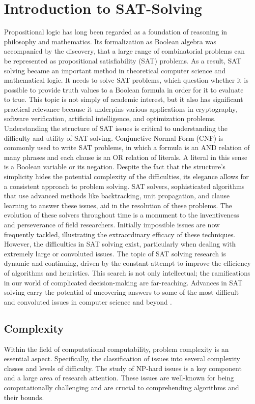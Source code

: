 \documentclass[bachelor, english]{algothesis}
\begin{document}
\section{Introduction to SAT-Solving}
Propositional logic has long been regarded as a foundation of reasoning in philosophy and mathematics. Its formalization as Boolean algebra was accompanied by the discovery, that a large range of combinatorial problems can be represented as propositional satisfiability (SAT) problems. As a result, SAT solving became an important method in theoretical computer science and mathematical logic. It needs to solve SAT problems, which question whether it is possible to provide truth values to a Boolean formula in order for it to evaluate to true. This topic is not simply of academic interest, but it also has significant practical relevance because it underpins various applications in cryptography, software verification, artificial intelligence, and optimization problems. Understanding the structure of SAT issues is critical to understanding the difficulty and utility of SAT solving. Conjunctive Normal Form (CNF) is commonly used to write SAT problems, in which a formula is an AND relation of many phrases and each clause is an OR relation of literals. A literal in this sense is a Boolean variable or its negation. Despite the fact that the structure's simplicity hides the potential complexity of the difficulties, its elegance allows for a consistent approach to problem solving. SAT solvers, sophisticated algorithms that use advanced methods like backtracking, unit propagation, and clause learning to answer these issues, aid in the resolution of these problems. The evolution of these solvers throughout time is a monument to the inventiveness and perseverance of field researchers. Initially impossible issues are now frequently tackled, illustrating the extraordinary efficacy of these techniques. However, the difficulties in SAT solving exist, particularly when dealing with extremely large or convoluted issues. The topic of SAT solving research is dynamic and continuing, driven by the constant attempt to improve the efficiency of algorithms and heuristics. This search is not only intellectual; the ramifications in our world of complicated decision-making are far-reaching. Advances in SAT solving carry the potential of uncovering answers to some of the most difficult and convoluted issues in computer science and beyond \cite{Sat_solving}.

\subsection{Complexity}
Within the field of computational computability, problem complexity is an essential aspect. Specifically, the classification of issues into several complexity classes and levels of difficulty. The study of NP-hard issues is a key component and a large area of research attention. These issues are well-known for being computationally challenging and are crucial to comprehending algorithms and their bounds.
\end{document}
